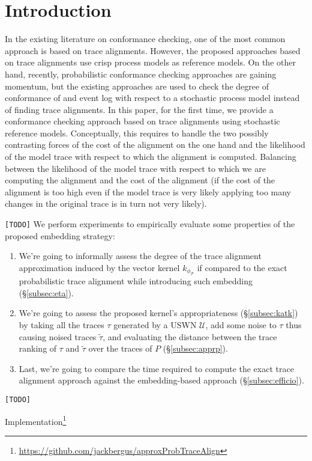 \section{Introduction}\label{introduction}


In the existing literature on conformance checking, one of the most common approach is based on trace alignments. However, the proposed approaches based on trace alignments use crisp process models as reference models. On the other hand, recently, probabilistic conformance checking approaches are gaining momentum, but the existing approaches are used to check the degree of conformance of and event log with respect to a stochastic process model instead of finding trace alignments.
In this paper, for the first time, we provide a conformance checking approach based on trace alignments using stochastic reference models. Conceptually, this requires to handle the two possibly contrasting forces of the cost of the alignment on the one hand and the likelihood of the model trace with respect to which the alignment is computed.
Balancing between the likelihood of the model trace with respect to which we are computing the alignment and the cost of the alignment (if the cost of the alignment is too high even if the model trace is very likely applying too many changes in the original trace is in turn not very likely).




\texttt{\color{red}[TODO]}
We perform experiments to empirically evaluate some properties of the proposed embedding strategy:
\begin{enumerate}
	\item {We're going to informally assess the degree of the trace alignment approximation induced by the vector kernel $k_{\phi_\mathcal{P}}$  if compared to the exact probabilistic trace alignment while introducing such embedding (\S\ref{subsec:eta}).}
	\item We're going to assess the proposed kernel's appropriateness (\S\ref{subsec:katk}) by taking all the traces $\tau$ generated by a USWN $\mathcal{U}$, add some noise to $\tau$ thus causing noised traces $\tilde{\tau}$, and evaluating the distance between the trace ranking of $\tau$ and $\tilde{\tau}$ over the traces of $P$ (\S\ref{subsec:apprp}). 
	\item Last, we're going to compare the time required to compute the exact trace alignment approach against the embedding-based approach (\S\ref{subsec:efficio}).
\end{enumerate}
\texttt{\color{red}[TODO]}

Implementation\footnote{\url{https://github.com/jackbergus/approxProbTraceAlign}}
